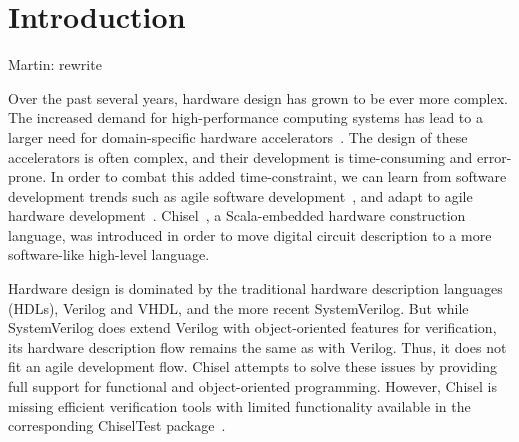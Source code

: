 \documentclass[conference]{IEEEtran}
\newcommand{\martin}[1]{{\color{blue} Martin: #1}}
\begin{document}
\section{Introduction}
\label{sec:introduction}

\martin{rewrite}

Over the past several years, hardware design has grown to be ever more complex.
The increased demand for high-performance computing systems has lead to a larger need for domain-specific hardware accelerators~\cite{domain-hw-acc:2020}.
The design of these accelerators is often complex, and their development is time-consuming and error-prone.
In order to combat this added time-constraint, we can learn from software development trends such as agile software development~\cite{agile:manifesto}, and adapt to agile hardware development~\cite{henn-patt:turing:2019}.
Chisel~\cite{chisel:dac2012}, a Scala-embedded hardware construction language, was introduced in order to move digital circuit description to a more software-like high-level language. 

Hardware design is dominated by the traditional hardware description languages (HDLs), Verilog and VHDL, and %
the more recent SystemVerilog. But while SystemVerilog  %
does extend Verilog with object-oriented features for verification, its hardware %
description flow remains the same as with Verilog. Thus, it does not fit an agile %
development flow. %
Chisel attempts to solve these issues by providing full support for %
functional and object-oriented programming. However, Chisel is missing efficient verification tools %
with limited functionality available in the corresponding ChiselTest package~\cite{chisel:tester2}. %
\end{document}
